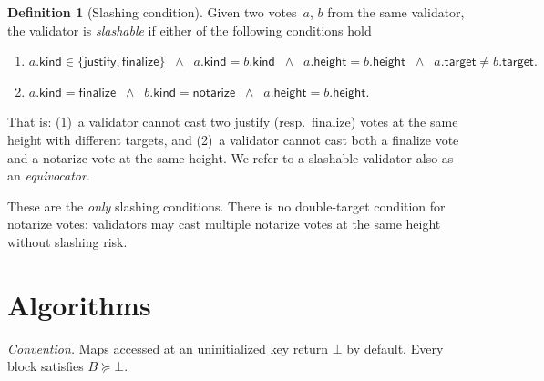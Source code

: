 \ifx\litemode\undefined\documentclass{article}\fi
\newcommand{\target}{\mathsf{target}}
\newcommand{\kind}{\mathsf{kind}}
\newcommand{\height}{\mathsf{height}}
\newcommand{\finalize}{\mathsf{finalize}}
\newcommand{\justify}{\mathsf{justify}}
\newcommand{\notarize}{\mathsf{notarize}}
\theoremstyle{plain}
\theoremstyle{definition}
\newtheorem{definition}[theorem]{Definition}
\theoremstyle{remark}
\begin{document}
\begin{definition}[Slashing condition]\label{def:slashing}
Given two votes~$a$, $b$ from the same validator, the validator is \emph{slashable} if either of the following conditions hold
\begin{enumerate}
  \item \(
    a.\kind \in \{\justify,\finalize\}
    \;\;\wedge\;\;
    a.\kind = b.\kind
    \;\;\wedge\;\;
    a.\height = b.\height
    \;\;\wedge\;\;
    a.\target \neq b.\target.
  \)

  \item \(
    a.\kind = \finalize
    \;\;\wedge\;\;
    b.\kind = \notarize
    \;\;\wedge\;\;
    a.\height = b.\height.
  \)
\end{enumerate}

That is: (1)~a validator cannot cast two justify (resp.\ finalize) votes at the same height with different targets, and (2)~a validator cannot cast both a finalize vote and a notarize vote at the same height.
We refer to a slashable validator also as an \emph{equivocator}.

These are the \emph{only} slashing conditions.
There is no double-target condition for notarize votes: validators may cast multiple notarize votes at the same height without slashing risk.
\end{definition}

\section{Algorithms}

\emph{Convention.} Maps accessed at an uninitialized key return $\bot$ by default.
Every block satisfies $B \succeq \bot$.
\end{document}
